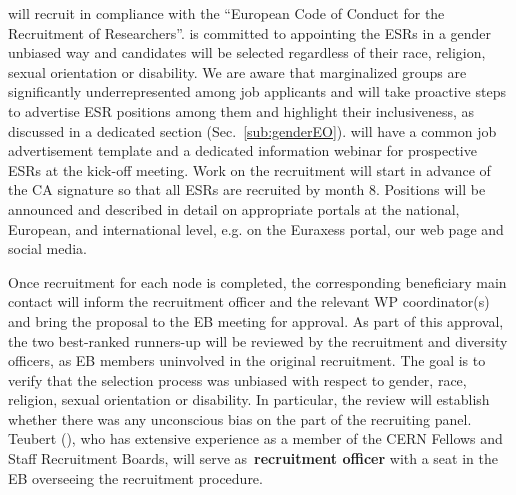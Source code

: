 \acronym will recruit in compliance with
the ``European Code of Conduct for the Recruitment of Researchers''. 
\acronym is committed to appointing the ESRs in a gender unbiased way and
candidates will be selected regardless of their race, religion,
sexual orientation or disability. We are aware that marginalized groups
are significantly underrepresented among job applicants and will take proactive
steps to advertise \acronym ESR positions among them and highlight their inclusiveness, as discussed in a dedicated section (Sec.~\ref{sub:genderEO}).
%
\acronym will have a common job advertisement template and a dedicated information webinar for prospective
ESRs at the kick-off meeting. Work on the recruitment will start in advance of the CA signature so that all
ESRs are recruited by month 8.
Positions will be announced and described in detail on appropriate portals at the national, European, and international level, e.g.
on the Euraxess portal, our web page and social media.

Once recruitment for each node is completed, the corresponding
beneficiary main contact will inform the recruitment officer and the 
relevant WP coordinator(s) and bring the proposal to the EB meeting for approval. %
As part of this approval, the two
best-ranked runners-up will be reviewed by the recruitment and
diversity officers, as EB members uninvolved in the original recruitment. 
The goal is to verify that the selection
process was unbiased with respect to gender, race, religion,
sexual orientation or disability. In particular, the review %
will establish whether there was any unconscious bias
on the part of the recruiting panel. Teubert (\cernentity), who has
extensive experience as a member of the CERN Fellows and Staff Recruitment Boards,
will serve as~\textbf{recruitment officer} with a seat in the EB overseeing the recruitment procedure. 

